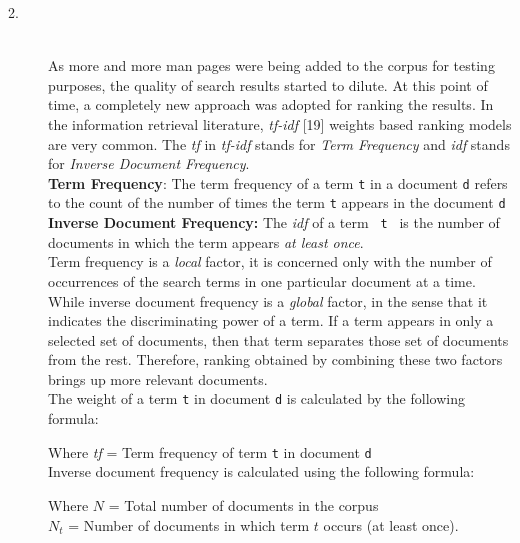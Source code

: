 \documentclass[letterpaper,twocolumn,10pt]{article}
\begin{document}
\begin{description}
\item[2.] \hfill \\
As more and more man pages were being added to the corpus for testing purposes,
the quality of search results started to dilute. At this point of time, a
completely new approach was adopted for ranking the results. In the information
retrieval literature, \textit{tf-idf} [19] weights based ranking models are very common. The \textit{tf} in \textit{tf-idf} stands for \emph{Term Frequency} and \textit{idf} stands for \emph{Inverse Document Frequency}. \\

{\bf Term Frequency}: The term frequency of a term {\tt \small t} in a document
{\tt d} refers to the count of the number of times the term {\tt \small t}
appears in the document {\tt \small d } \\

{\bf Inverse Document Frequency:} The \textit{idf} of a term
{\tt \small
t
}
is the number of documents in which the term appears \textit{at least once}. \\

Term frequency is a \textit{local} factor, it is concerned only with the number
of occurrences of the search terms in one particular document at a time.
While inverse document frequency is a \textit{global} factor, in the sense that
it indicates the discriminating power of a term. If a term appears in only a
selected set of documents, then that term separates those set of
documents from the rest. Therefore, ranking obtained by combining these two factors
brings up more relevant documents. \\

The weight of a term
{\tt \small t} in document {\tt \small d} is calculated by the following
formula:

\begin{center}
\end{center}
Where \textit{tf} = Term frequency of term {\tt \small t} in document
{\tt \small d} \\

Inverse document frequency is calculated using the following formula:
\begin{center}
\end{center}
Where $N$ = Total number of documents in the corpus \\
$N_t$ = Number of documents in which term $t$ occurs (at least once). \\


\end{description}
\end{document}
